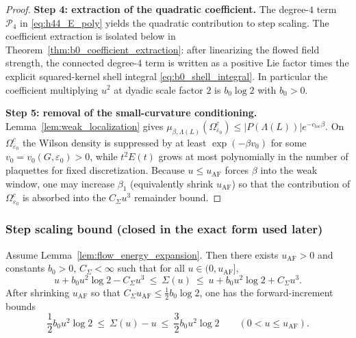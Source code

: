 \begin{proof}
\smallskip
\textbf{Step 4: extraction of the quadratic coefficient.}
The degree-$4$ term $\mathcal P_4$ in \eqref{eq:h44_E_poly} yields the quadratic contribution to step scaling.
The coefficient extraction is isolated below in Theorem~\ref{thm:b0_coefficient_extraction}: after linearizing the flowed field strength,
the connected degree-$4$ term is written as a positive Lie factor times the explicit squared-kernel shell integral
\eqref{eq:b0_shell_integral}.
In particular the coefficient multiplying $u^2$ at dyadic scale factor $2$ is $b_0\log 2$ with $b_0>0$.

\smallskip
\textbf{Step 5: removal of the small-curvature conditioning.}
Lemma~\ref{lem:weak_localization} gives $\mu_{\beta,\Lambda(L)}(\Omega_{\varepsilon_0}^c)\le |P(\Lambda(L))|e^{-c_{\mathrm{loc}}\beta}$.
On $\Omega_{\varepsilon_0}^c$ the Wilson density is suppressed by at least $\exp(-\beta v_0)$ for some $v_0=v_0(G,\varepsilon_0)>0$,
while $t^2E(t)$ grows at most polynomially in the number of plaquettes for fixed discretization.
Because $u\le u_{\mathrm{AF}}$ forces $\beta$ into the weak window, one may increase $\beta_1$ (equivalently shrink $u_{\mathrm{AF}}$)
so that the contribution of $\Omega_{\varepsilon_0}^c$ is absorbed into the $C_{\Sigma}u^3$ remainder bound.
\end{proof}
\subsubsection{Step scaling bound (closed in the exact form used later)}
\begin{proposition}\label{prop:stepscaling_control_proved}
Assume Lemma~\ref{lem:flow_energy_expansion}. Then there exists $u_{\mathrm{AF}}>0$ and constants $b_0>0$, $C_\Sigma<\infty$ such that for all $u\in(0,u_{\mathrm{AF}}]$,
\begin{equation}\label{eq:stepscaling_bound_two_sided}
 u + b_0 u^2 \log 2 - C_\Sigma u^3
 \ \le\ \Sigma(u)\ \le\
 u + b_0 u^2 \log 2 + C_\Sigma u^3.
\end{equation}
After shrinking $u_{\mathrm{AF}}$ so that $C_\Sigma u_{\mathrm{AF}}\le \tfrac12 b_0\log 2$, one has the forward-increment bounds
\begin{equation}\label{eq:stepscaling_increment_window}
 \frac12 b_0 u^2\log 2
 \ \le\ \Sigma(u)-u\ \le\
 \frac32 b_0 u^2\log 2
 \qquad (0<u\le u_{\mathrm{AF}}).
\end{equation}
\end{proposition}

